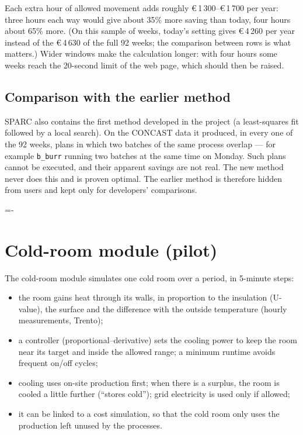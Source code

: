 \documentclass[10pt,a4paper]{scrartcl}
\makeatletter
\newcommand{\Eur}[1]{\euro\,#1}
\renewcommand{\emph}[1]{\textcolor{accent}{#1}}
\newcommand{\NeedSpace}[1]{\par\begingroup\dimen@=\pagegoal\advance\dimen@-\pagetotal
    \ifdim\dimen@<#1\relax\newpage\fi\endgroup}
\newcommand{\RuleSection}[1]{%
    \NeedSpace{10\baselineskip}%
    \section{#1}%
    \vspace{0.2em}{\color{accent!35}\hrule height 0.4pt}\vspace{0.3em}%
  }
\makeatother
\begin{document}
  Each extra hour of allowed movement adds roughly \Eur{1\,300}--\Eur{1\,700} per year: three hours
  each way would give about 35\% more saving than today, four hours about 65\% more. (On this
  sample of weeks, today's setting gives \Eur{4\,260} per year instead of the \Eur{4\,630} of the
  full 92 weeks; the comparison between rows is what matters.) Wider windows make the calculation
  longer: with four hours some weeks reach the 20-second limit of the web page, which should then be
  raised.

  \subsection{Comparison with the earlier method}

  SPARC also contains the first method developed in the project (a least-squares fit followed by a
  local search). On the CONCAST data it produced, \emph{in every one of the 92 weeks}, plans in
  which two batches of the same process overlap --- for example \texttt{b\_burr} running two batches
  at the same time on Monday. Such plans cannot be executed, and their apparent savings are not
  real. The new method never does this and is proven optimal. The earlier method is therefore hidden
  from users and kept only for developers' comparisons.

  \RuleSection{Cold-room module (pilot)}
  \label{sec:coldroom}

  The cold-room module simulates one cold room over a period, in 5-minute steps:
  \begin{itemize}
    \item the room gains heat through its walls, in proportion to the insulation (U-value), the
      surface and the difference with the outside temperature (hourly measurements, Trento);
    \item a controller (proportional--derivative) sets the cooling power to keep the room near its
      target and inside the allowed range; a minimum runtime avoids frequent on/off cycles;
    \item cooling uses on-site production first; when there is a surplus, the room is cooled a little
      further (``stores cold''); grid electricity is used only if allowed;
    \item it can be linked to a cost simulation, so that the cold room only uses the production left
      unused by the processes.
  \end{itemize}
\end{document}
